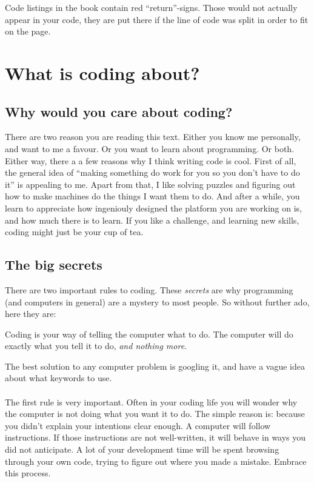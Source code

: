 \documentclass[11pt,fleqn]{book} %
\begin{document}
\begin{remark}
	Code listings in the book contain red ``return''-signs. Those would not actually appear in your code, they are put there if the line of code was split in order to fit on the page.
\end{remark}

\section{What is coding about?}

\subsection{Why would you care about coding?}
There are two reason you are reading this text. Either you know me personally, and want to me a favour. Or you want to learn about programming. Or both.
Either way, there a a few reasons why I think writing code is cool. First of all, the general idea of ``making something do work for you so you don't have to do it'' is appealing to me.
Apart from that, I like solving puzzles and figuring out how to make machines do the things I want them to do.
And after a while, you learn to appreciate how ingeniouly designed the platform you are working on is, and how much there is to learn.
If you like a challenge, and learning new skills, coding might just be your cup of tea.

\subsection{The big secrets}
There are two important rules to coding. These \emph{secrets} are why programming (and computers in general) are a mystery to most people.
So without further ado, here they are:

\begin{theorem}
Coding is your way of telling the computer what to do. The computer will do exactly what you tell it to do, \emph{and nothing more}.
\end{theorem}

\begin{theorem}
The best solution to any computer problem is googling it, and have a vague idea about what keywords to use.
\end{theorem}

\paragraph{}The first rule is very important. Often in your coding life you will wonder why the computer is not doing what you want it to do. The simple reason is: because you didn't explain your intentions clear enough. A computer will follow instructions. If those instructions are not well-written, it will behave in ways you did not anticipate. A lot of your development time will be spent browsing through your own code, trying to figure out where you made a mistake. Embrace this process.
\end{document}
